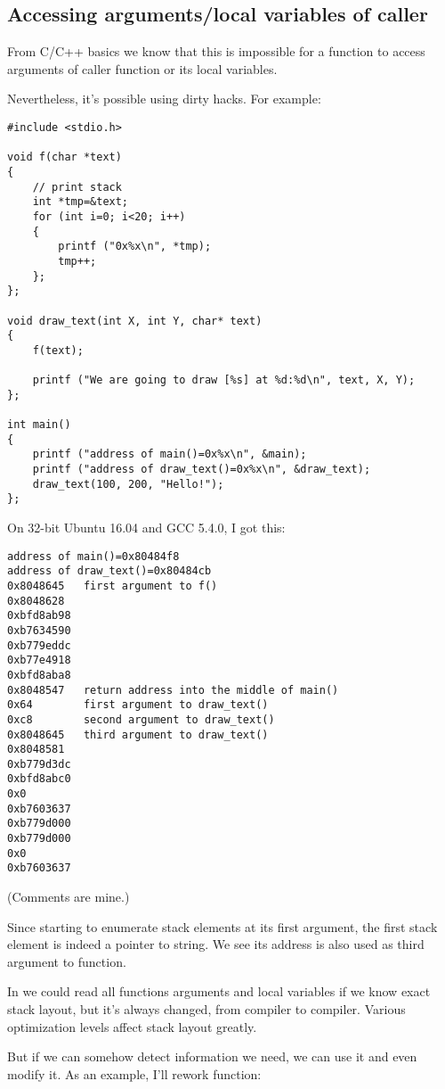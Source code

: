 \subsection{Accessing arguments/local variables of caller}

From C/C++ basics we know that this is impossible for a function to access arguments of caller function or its
local variables.

Nevertheless, it's possible using dirty hacks.
For example:

\begin{lstlisting}[style=customc]
#include <stdio.h>

void f(char *text)
{
	// print stack
	int *tmp=&text;
	for (int i=0; i<20; i++)
	{
		printf ("0x%x\n", *tmp);
		tmp++;
	};
};

void draw_text(int X, int Y, char* text)
{
	f(text);

	printf ("We are going to draw [%s] at %d:%d\n", text, X, Y);
};

int main()
{
	printf ("address of main()=0x%x\n", &main);
	printf ("address of draw_text()=0x%x\n", &draw_text);
	draw_text(100, 200, "Hello!");
};
\end{lstlisting}

On 32-bit Ubuntu 16.04 and GCC 5.4.0, I got this:

\begin{lstlisting}
address of main()=0x80484f8
address of draw_text()=0x80484cb
0x8048645	first argument to f()
0x8048628
0xbfd8ab98
0xb7634590
0xb779eddc
0xb77e4918
0xbfd8aba8
0x8048547	return address into the middle of main()
0x64		first argument to draw_text()
0xc8		second argument to draw_text()
0x8048645	third argument to draw_text()
0x8048581
0xb779d3dc
0xbfd8abc0
0x0
0xb7603637
0xb779d000
0xb779d000
0x0
0xb7603637
\end{lstlisting}

(Comments are mine.)

Since  starting to enumerate stack elements at its first argument, the first stack element is indeed a pointer
to  string. We see its address is also used as third argument to  function.

In  we could read all functions arguments and local variables if we know exact stack layout, but it's always
changed, from compiler to compiler.
Various optimization levels affect stack layout greatly.

But if we can somehow detect information we need, we can use it and even modify it.
As an example, I'll rework  function:

